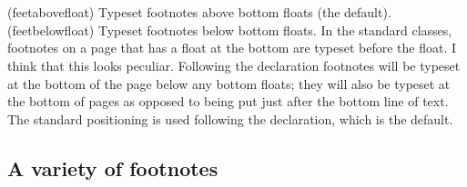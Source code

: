 \begin{syntax}
\cmd{\feetabovefloat} \\
\cmd{\feetbelowfloat} \\
\end{syntax}
\label{interest:feetbelowfloat}
\glossary(feetabovefloat)%
  {}%
  {Typeset footnotes above bottom floats (the default).}
\glossary(feetbelowfloat)%
  {}%
  {Typeset footnotes below bottom floats.}
In the standard classes, footnotes on a page that has a float at the
bottom are typeset before the float. I think that this looks
peculiar. Following the \cmd{\feetbelowfloat} declaration footnotes 
will be typeset at the bottom of the page below any bottom 
floats; 
they will also be typeset at the bottom of \cmd{\raggedbottom} pages 
as opposed to being
put just after the bottom line of text. The standard positioning is
used following the \cmd{\feetabovefloat} declaration, which is the default.






\subsection{A variety of footnotes}

